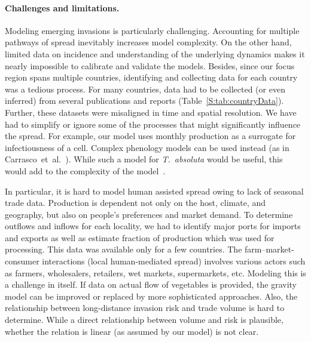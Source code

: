\documentclass[11pt]{article}
\newcommand{\tuta}{\emph{T.~absoluta}}
\theoremstyle{definition}
\begin{document}
\paragraph{Challenges and limitations.}
Modeling emerging invasions is particularly challenging. Accounting for
multiple pathways of spread inevitably increases model complexity. On the
other hand, limited data on incidence and understanding of the underlying
dynamics makes it nearly impossible to calibrate and validate the models.
Besides, since our focus region spans multiple countries, identifying and
collecting data for each country was a tedious process. For many countries,
data had to be collected (or even inferred) from several publications and
reports (Table~\ref{S:tab:countryData}). Further, these datasets were
misaligned in time and spatial resolution. We have had to simplify or
ignore some of the processes that might significantly influence the spread.
For example, our model uses monthly production as a surrogate for
infectiousness of a cell. Complex phenology models can be used instead (as
in Carrasco~et~al.~\cite{carrasco2010unveiling}). While such a model for
\tuta{} would be useful, this would add to the complexity of
the model~\cite{robinet2012suite}.

In particular, it is hard to model human assisted spread owing to lack of
seasonal trade data. Production is dependent not only on the host, climate,
and geography, but also on people's preferences and market demand. To
determine outflows and inflows for each locality, we had to identify major
ports for imports and exports as well as estimate fraction of production
which was used for processing. This data was available only for a few
countries.  The farm--market-consumer interactions (local human-mediated
spread) involves various actors such as farmers, wholesalers, retailers,
wet markets, supermarkets, etc. Modeling this is a challenge in itself. If
data on actual flow of vegetables is provided, the gravity model can be
improved or replaced by more sophisticated approaches. Also, the
relationship between long-distance invasion risk and trade volume is hard
to determine. While a direct relationship between volume and risk is
plausible, whether the relation is linear (as assumed by our model) is not
clear.
\end{document}

